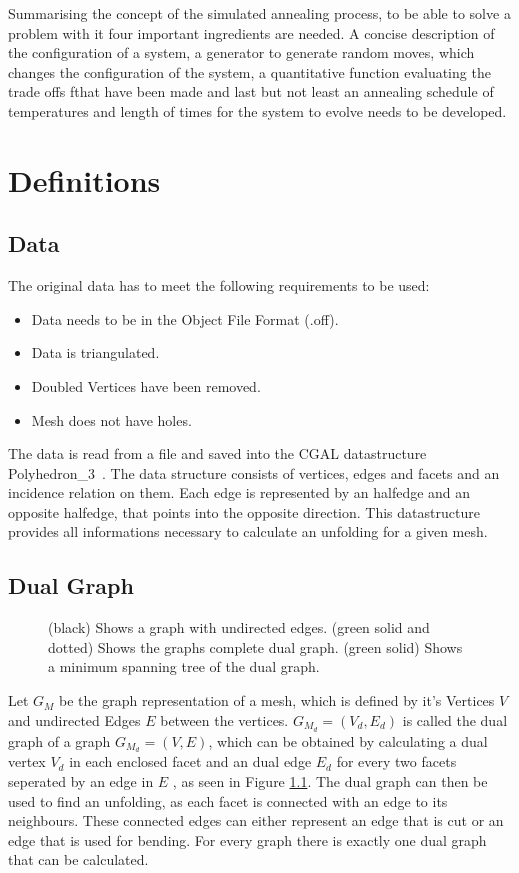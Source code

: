 \documentclass[draft,final]{vutinfth} %
\begin{document}
Summarising the concept of the simulated annealing process, to be able to solve a problem with it four important ingredients are needed. A concise description of the configuration of a system, a generator to generate random moves, which changes the configuration of the system, a quantitative function evaluating the trade offs fthat have been made and last but not least an annealing schedule of temperatures and length of times for the system to evolve needs to be developed.
\chapter{Definitions}
\label{chap:definitions}

\section{Data}

The original data has to meet the following requirements to be used:
\begin{itemize}
	\item Data needs to be in the Object File Format (.off)\cite{offfile}.
	\item Data is triangulated.
	\item Doubled Vertices have been removed.
	\item Mesh does not have holes.
\end{itemize}

The data is read from a file and saved into the CGAL datastructure Polyhedron\_3~\cite{cgal:eb-19a}. The data structure consists of vertices, edges and facets and an incidence relation on them. Each edge is represented by an halfedge and an opposite halfedge, that points into the opposite direction. This datastructure provides all informations necessary to calculate an unfolding for a given mesh.

\section{Dual Graph}

\begin{figure}

\caption{(black) Shows a graph with undirected edges. (green solid and dotted) Shows the graphs complete dual graph. (green solid) Shows a minimum spanning tree of the dual graph.}
\label{fig:dualgraph}
\end{figure}

Let $G_M$ be the graph representation of a mesh, which is defined by it's Vertices $V$ and undirected Edges $E$ between the vertices. $G_{M_d} = (V_d, E_d)$ is called the dual graph of a graph $G_{M_d} = (V,E)$, which can be obtained by calculating a dual vertex $V_d$ in each enclosed facet and an dual edge $E_d$ for every two facets seperated by an edge in $E$ \cite{gross2004handbook}, as seen in Figure \ref{fig:dualgraph}. The dual graph can then be used to find an unfolding, as each facet is connected with an edge to its neighbours. These connected edges can either represent an edge that is cut or an edge that is used for bending. For every graph there is exactly one dual graph that can be calculated.
\end{document}
